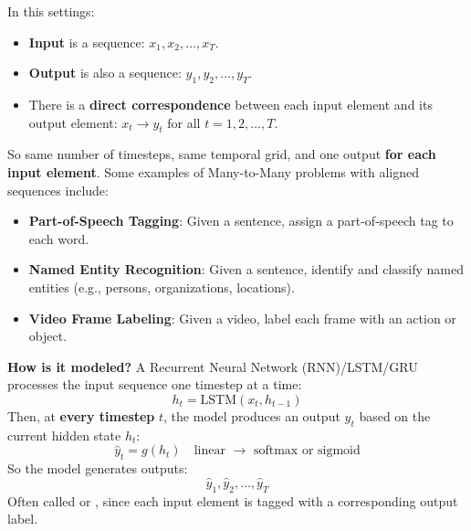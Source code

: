 \begin{itemize}
    In this settings:
    \begin{itemize}
        \item \textbf{Input} is a sequence: $x_1, x_2, \ldots, x_T$.
        \item \textbf{Output} is also a sequence: $y_1, y_2, \ldots, y_T$.
        \item There is a \textbf{direct correspondence} between each input element and its output element: $x_t \to y_t$ for all $t = 1, 2, \ldots, T$.
    \end{itemize}
    So same number of timesteps, same temporal grid, and one output \textbf{for each input element}. Some examples of Many-to-Many problems with aligned sequences include:
    \begin{itemize}
        \item \textbf{Part-of-Speech Tagging}: Given a sentence, assign a part-of-speech tag to each word.
        \item \textbf{Named Entity Recognition}: Given a sentence, identify and classify named entities (e.g., persons, organizations, locations).
        \item \textbf{Video Frame Labeling}: Given a video, label each frame with an action or object.
    \end{itemize}
    \textcolor{Green3}{ \textbf{How is it modeled?}} A Recurrent Neural Network (RNN)/LSTM/GRU processes the input sequence one timestep at a time:
    \begin{equation*}
        h_t = \text{LSTM}\left(x_t, h_{t-1}\right)
    \end{equation*}
    Then, at \textbf{every timestep} $t$, the model produces an output $y_t$ based on the current hidden state $h_t$:
    \begin{equation*}
        \hat{y}_t = g\left(h_t\right) \quad \text{linear } \to \text{ softmax or sigmoid}
    \end{equation*}
    So the model generates outputs:
    \begin{equation*}
        \hat{y}_1, \hat{y}_2, \ldots, \hat{y}_T
    \end{equation*}
    Often called  or , since each input element is tagged with a corresponding output label.
\end{itemize}

